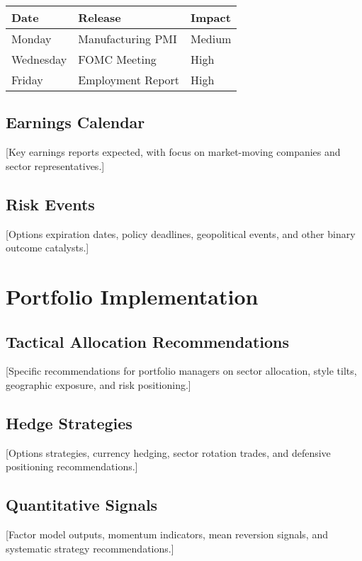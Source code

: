 \documentclass[11pt,a4paper]{article}
\begin{document}
\begin{tabular}{@{}lll@{}}
\toprule
\textbf{Date} & \textbf{Release} & \textbf{Impact} \\
\midrule
Monday & Manufacturing PMI & Medium \\
\rowcolor{tablealternate}
Wednesday & FOMC Meeting & High \\
Friday & Employment Report & High \\
\bottomrule
\end{tabular}

\subsection{Earnings Calendar}

[Key earnings reports expected, with focus on market-moving companies and sector representatives.]

\subsection{Risk Events}

[Options expiration dates, policy deadlines, geopolitical events, and other binary outcome catalysts.]

\section{Portfolio Implementation}

\subsection{Tactical Allocation Recommendations}

[Specific recommendations for portfolio managers on sector allocation, style tilts, geographic exposure, and risk positioning.]

\subsection{Hedge Strategies}

[Options strategies, currency hedging, sector rotation trades, and defensive positioning recommendations.]

\subsection{Quantitative Signals}

[Factor model outputs, momentum indicators, mean reversion signals, and systematic strategy recommendations.]
\end{document}
